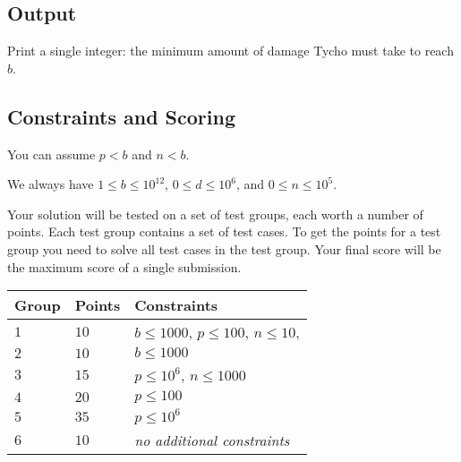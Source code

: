 \subsection*{Output}

Print a single integer: the minimum amount of damage Tycho must take to reach $b$.

\subsection*{Constraints and Scoring}

You can assume
$p < b$ %
and
$n < b$. %

We always have
$1\leq b\leq 10^{12}$, %
$0\leq d \leq 10^6$, %
and
$0\leq n \leq 10^5$. %

Your solution will be tested on a set of test groups, each worth a number of points.
Each test group contains a set of test cases.
To get the points for a test group you need to solve all test cases in the test group.
Your final score will be the maximum score of a single submission.

\medskip
\begin{tabular}{lll}
Group & Points & Constraints \\\hline
  $1$ & $10$ & $b\leq 1000$, $p\leq 100$, $n\leq 10$, \\
  $2$ & $10$ & $b\leq 1000$ \\
  $3$ & $15$ & $p\leq 10^6$, $n\leq 1000$\\
  $4$ & $20$ & $p\leq 100$\\
  $5$ & $35$ & $p\leq 10^6$\\
  $6$ & $10$ & \emph{no additional constraints}
\end{tabular}
